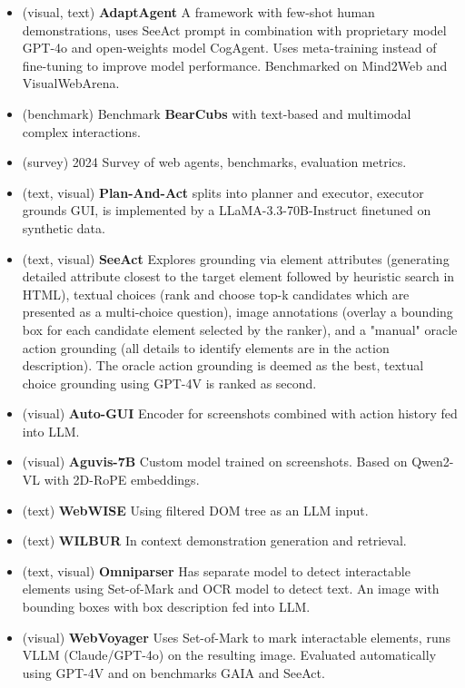 \begin{itemize}
    \item \textcite{verma_adaptagent_2025} (visual, text) \textbf{AdaptAgent} A framework with few-shot human demonstrations, uses SeeAct prompt in combination with proprietary model GPT-4o and open-weights model CogAgent. Uses meta-training instead of fine-tuning to improve model performance. Benchmarked on Mind2Web and VisualWebArena.
    \item \textcite{song_bearcubs_2025} (benchmark) Benchmark \textbf{BearCubs} with text-based and multimodal complex interactions.
    \item \textcite{nguyen_gui_2025} (survey) 2024 Survey of web agents, benchmarks, evaluation metrics.
    \item \textcite{erdogan_plan-and-act_2025} (text, visual) \textbf{Plan-And-Act} splits into planner and executor, executor grounds GUI, is implemented by a LLaMA-3.3-70B-Instruct finetuned on synthetic data.
    \item \textcite{zheng_gpt-4vision_2024} (text, visual) \textbf{SeeAct} Explores grounding via element attributes (generating detailed attribute closest to the target element followed by heuristic search in HTML), textual choices (rank and choose top-k candidates which are presented as a multi-choice question), image annotations (overlay a bounding box for each candidate element selected by the ranker), and a "manual" oracle action grounding (all details to identify elements are in the action description). The oracle action grounding is deemed as the best, textual choice grounding using GPT-4V is ranked as second.
    \item \textcite{zhang_you_2024} (visual) \textbf{Auto-GUI} Encoder for screenshots combined with action history fed into LLM.
    \item \textcite{xu_aguvis_2024} (visual) \textbf{Aguvis-7B} Custom model trained on screenshots. Based on Qwen2-VL with 2D-RoPE embeddings.
    \item \textcite{tao_webwise_2024} (text) \textbf{WebWISE} Using filtered DOM tree as an LLM input.
    \item \textcite{lutz_wilbur_2024} (text) \textbf{WILBUR} In context demonstration generation and retrieval.
    \item \textcite{lu_omniparser_2024} (text, visual) \textbf{Omniparser} Has separate model to detect interactable elements using Set-of-Mark and OCR model to detect text. An image with bounding boxes with box description fed into LLM.
    \item \textcite{he_webvoyager_2024} (visual) \textbf{WebVoyager} Uses Set-of-Mark to mark interactable elements, runs VLLM (Claude/GPT-4o) on the resulting image. Evaluated automatically using GPT-4V and on benchmarks GAIA and SeeAct.

\end{itemize}
